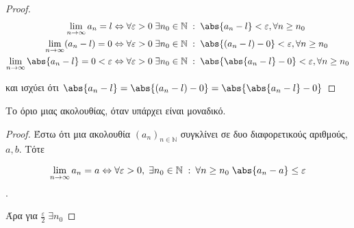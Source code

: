 \documentclass[main.tex]{subfiles}
\begin{document}
\begin{proof}
\item {}
    \begin{align*} \lim_{n \to \infty} a_{n}= l & \Leftrightarrow \forall \varepsilon > 0 
    \; \exists n_{0} \in \mathbb{N} \; : \; \abs{a_{n}-l} < \varepsilon, 
    \forall n \geq n_{0} \\ 
    \lim_{n \to \infty} (a_{n}-l) = 0 & \Leftrightarrow \forall \varepsilon >0 \; \exists n_{0} \in \mathbb{N} 
    \; : \; \abs { (a_{n}-l) - 0} < \varepsilon , \forall n \geq n_{0} \\
    \lim_{n \to \infty} \abs{a_{n}-l}=0 < \varepsilon & \Leftrightarrow \forall \varepsilon > 0 \; \exists n_{0} \in \mathbb{N} 
    \; : \; \abs {\abs{a_{n}- l } - 0} < \varepsilon, \forall n \geq n_{0} 
\end{align*}

και ισχύει ότι $ \abs{a_{n}-l} = \abs{(a_{n}-l)-0} = \abs{\abs{a_{n}- l} -0} $
\end{proof}

\begin{thm}
    Το όριο μιας ακολουθίας, όταν υπάρχει είναι μοναδικό.
\end{thm}

\begin{proof}
    Έστω ότι μια ακολουθία $ (a_{n})_{n \in \mathbb{N}} $ συγκλίνει σε δυο 
    διαφορετικούς αριθμούς, $ a,b $. Τότε

    \[ \lim_{n \to \infty} a_{n} = a \Leftrightarrow \forall \varepsilon > 0, 
    \; \exists n_{0} \in \mathbb{N} \; : \: \forall n \geq n_{0} \; 
    \abs{a_{n}- a} \leq \varepsilon \].

    Άρα για $ \frac{\varepsilon}{2} \; \exists n_{0} $



\end{proof}
\end{document}

